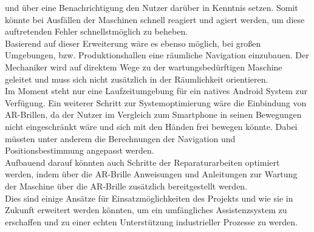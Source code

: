 und über eine Benachrichtigung den Nutzer darüber in Kenntnis setzen. Somit könnte bei Ausfällen der Maschinen schnell reagiert und agiert werden, um diese auftretenden 
Fehler schnellstmöglich zu beheben. 
\\ 
Basierend auf dieser Erweiterung wäre es ebenso möglich, bei großen Umgebungen, bzw. Produktionshallen eine räumliche Navigation einzubauen. Der Mechaniker wird auf 
direktem Wege zu der wartungsbedürftigen Maschine geleitet und muss sich nicht zusätzlich in der Räumlichkeit orientieren. 
\\ 
\linebreak
Im Moment steht nur eine Laufzeitumgebung für ein natives Android System zur Verfügung. Ein weiterer Schritt zur Systemoptimierung wäre die Einbindung von \acs{AR}-Brillen, 
da der Nutzer im Vergleich zum Smartphone in seinen Bewegungen nicht eingeschränkt wäre und sich mit den Händen frei bewegen könnte. Dabei müssten unter anderem 
die Berechnungen der Navigation und Positionsbestimmung angepasst werden.
\\ 
Aufbauend darauf könnten auch Schritte der Reparaturarbeiten optimiert werden, indem über die \acs{AR}-Brille Anweisungen und Anleitungen zur Wartung der 
Maschine über die \acs{AR}-Brille zusätzlich bereitgestellt werden. 
\\ 
\linebreak
Dies sind einige Ansätze für Einsatzmöglichkeiten des Projekts und wie sie in Zukunft erweitert werden könnten, um ein umfängliches Assistenzsystem zu erschaffen und zu einer 
echten Unterstützung industrieller Prozesse zu werden.  

